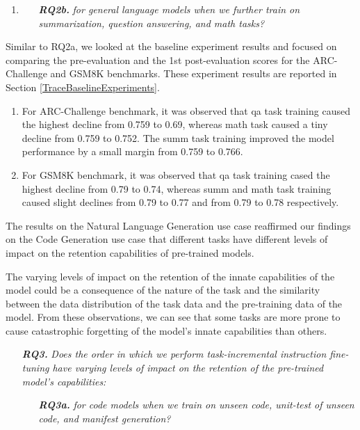 \newcommand{\RQtwob}{for general language models when we further train on summarization, question answering, and math tasks?}
\begin{enumerate}
\item  
    \begin{enumerate}
        \item[\textit{\textbf{RQ2b.}}] \textit{\RQtwob}
    \end{enumerate}
\end{enumerate}

Similar to RQ2a, we looked at the baseline experiment results and focused on comparing the pre-evaluation and the 1st post-evaluation scores for the ARC-Challenge and GSM8K benchmarks. These experiment results are reported in Section \ref{TraceBaselineExperiments}. 
\begin{enumerate}
\item For ARC-Challenge benchmark, it was observed that qa task training caused the highest decline from 0.759 to 0.69, whereas math task caused a tiny decline from 0.759 to 0.752. The summ task training improved the model performance by a small margin from 0.759 to 0.766.
\item For GSM8K benchmark, it was observed that qa task training cased the highest decline from 0.79 to 0.74, whereas summ and math task training caused slight declines from 0.79 to 0.77 and from 0.79 to 0.78 respectively.
\end{enumerate}

The results on the Natural Language Generation use case reaffirmed our findings on the Code Generation use case that different tasks have different levels of impact on the retention capabilities of pre-trained models.

The varying levels of impact on the retention of the innate capabilities of the model could be a consequence of the nature of the task and the similarity between the data distribution of the task data and the pre-training data of the model. From these observations, we can see that some tasks are more prone to cause catastrophic forgetting of the model’s innate capabilities than others. 

\newcommand{\RQthree}{Does the order in which we perform task-incremental instruction fine-tuning have varying levels of impact on the retention of the pre-trained model’s capabilities:}
\newcommand{\RQthreea}{for code models when we train on unseen code, unit-test of unseen code, and manifest generation?}

\begin{enumerate}
    \item[\textit{\textbf{RQ3.}}] \textit{\RQthree}
    \begin{enumerate}
        \item[\textit{\textbf{RQ3a.}}] \textit{\RQthreea}
    \end{enumerate}
\end{enumerate}

